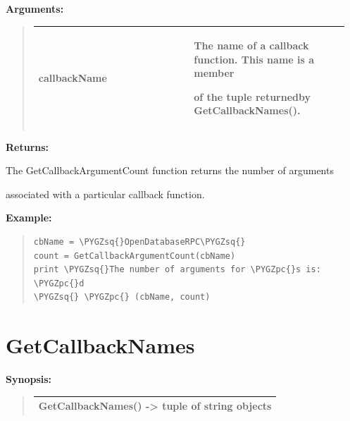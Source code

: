\documentclass[letterpaper,10pt,english]{sphinxmanual}
\def\PYGZpc{\char`\%}
\def\PYGZsq{\char`\'}
\renewcommand\PYGZsq{\textquotesingle}
\begin{document}
\begin{DUlineblock}{0em}
\item[] 
\item[] \textbf{Arguments:}
\end{DUlineblock}
\begin{quote}

\begin{tabular}{|p{0.475\linewidth}|p{0.475\linewidth}|}
\hline

callbackName
 & 
\begin{DUlineblock}{0em}
\item[] The name of a callback function. This name is a member
\item[] of the tuple returnedby GetCallbackNames().
\end{DUlineblock}
\\
\hline\end{tabular}

\end{quote}

\begin{DUlineblock}{0em}
\item[] 
\item[] \textbf{Returns:}
\item[] The GetCallbackArgumentCount function returns the number of arguments
\item[] associated with a particular callback function.
\item[] 
\end{DUlineblock}

\begin{DUlineblock}{0em}
\item[] \textbf{Example:}
\item[] 
\end{DUlineblock}
\begin{quote}

\begin{Verbatim}[commandchars=\\\{\}]
cbName = \PYGZsq{}OpenDatabaseRPC\PYGZsq{}
count = GetCallbackArgumentCount(cbName)
print \PYGZsq{}The number of arguments for \PYGZpc{}s is: \PYGZpc{}d
\PYGZsq{} \PYGZpc{} (cbName, count)
\end{Verbatim}
\end{quote}


\section{GetCallbackNames}
\label{functions:getcallbacknames}
\begin{DUlineblock}{0em}
\item[] \textbf{Synopsis:}
\end{DUlineblock}
\begin{quote}

\begin{tabulary}{\linewidth}{|L|}
\hline

GetCallbackNames() -\textgreater{} tuple of string objects
\\
\hline\end{tabulary}

\end{quote}
\end{document}
